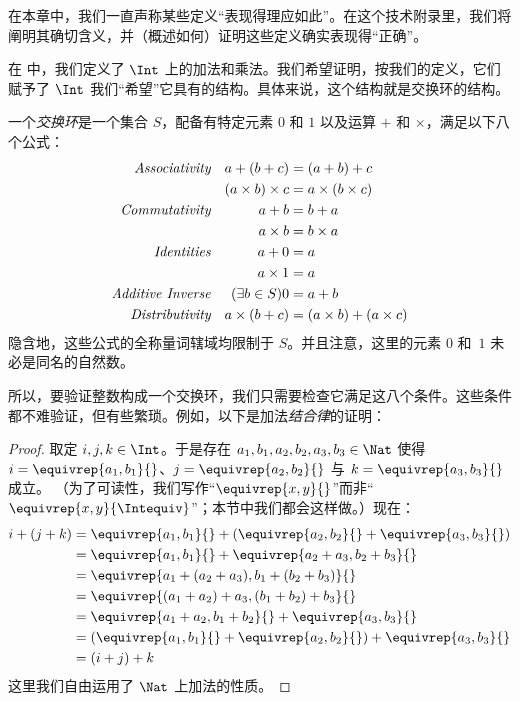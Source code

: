 \documentclass[../../../include/open-logic-section]{subfiles}
\begin{document}

在本章中，我们一直声称某些定义“表现得理应如此”。在这个技术附录里，我们将阐明其确切含义，并（概述如何）证明这些定义确实表现得“正确”。

在  中，我们定义了 $\Int$ 上的加法和乘法。我们希望证明，按我们的定义，它们赋予了 $\Int$ 我们“希望”它具有的结构。具体来说，这个结构就是交换环的结构。


\begin{defn}
	一个\emph{交换环}是一个集合 $S$，配备有特定元素 $0$ 和 $1$ 以及运算 $+$ 和 $\times$，满足以下八个公式：
	\begin{align*}
		\emph{Associativity}&&a + (b+ c) & = (a + b) + c \\
		&& (a \times b) \times c & = a \times (b\times c)\\
		\emph{Commutativity}&&a + b &= b+ a  \\
		&&  a \times b&= b\times a\\
		\emph{Identities}&&a + 0 &= a \\
		&& a \times 1 &= a\\
		\emph{Additive Inverse}&&(\exists b\in S)0&=a + b\\
		\emph{Distributivity}&&a \times (b+ c ) &= (a \times b) + (a \times c)
	\end{align*}
	隐含地，这些公式的全称量词辖域均限制于 $S$。并且注意，这里的元素 $0$ 和~$1$ 未必是同名的自然数。
\end{defn}


所以，要验证整数构成一个交换环，我们只需要检查它满足这八个条件。这些条件都不难验证，但有些繁琐。例如，以下是加法\emph{结合律}的证明：

\begin{proof}
取定 $i, j, k \in \Int$。于是存在 $a_1, b_1, a_2, b_2, a_3, b_3 \in
\Nat$ 使得 $i = \equivrep{a_1, b_1}{}$、$j =
\equivrep{a_2,b_2}{}$ 与 $k = \equivrep{a_3, b_3}{}$ 成立。
（为了可读性，我们写作“$\equivrep{x, y}{}$”而非“$\equivrep{x, y}{\Intequiv}$”；本节中我们都会这样做。）现在：
\begin{align*}
	i + (j + k) &= \equivrep{a_1, b_1}{}+(\equivrep{a_2, b_2}{} + \equivrep{a_3, b_3}{}) \\
	&= \equivrep{a_1,  b_1}{} + \equivrep{a_2+a_3, b_2+b_3}{}\\
	&= \equivrep{a_1 + (a_2 + a_3), b_1 + (b_2 + b_3)}{}\\
	&= \equivrep{(a_1 + a_2) + a_3, (b_1 + b_2) + b_3}{}\\
	&= \equivrep{a_1 + a_2, b_1 + b_2}{} + \equivrep{a_3, b_3}{}\\
	&= (\equivrep{a_1, b_1}{} + \equivrep{a_2, b_2}{}) + \equivrep{a_3, b_3}{}\\
	&= (i+j) + k
\end{align*}
这里我们自由运用了 $\Nat$ 上加法的性质。
\end{proof}
\end{document}

